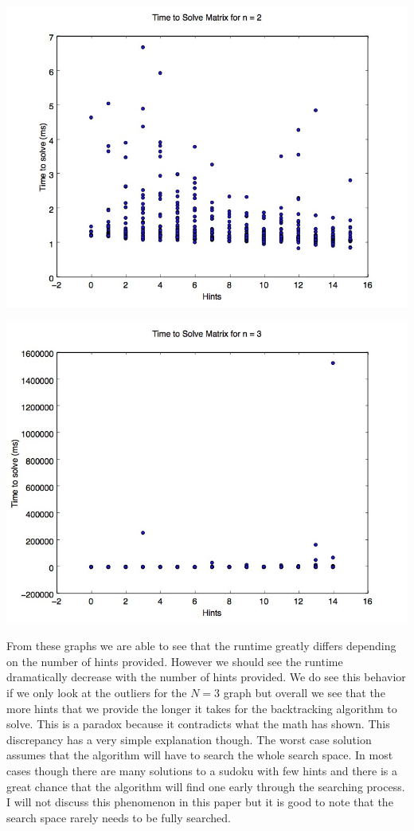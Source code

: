 \documentclass{sig-alternate}
\begin{document}
\includegraphics[width=\linewidth]{src/four.jpg}

\includegraphics[width=\linewidth]{src/nine.jpg}

From these graphs we are able to see that the runtime greatly differs depending on the number of hints provided. However we should see the runtime dramatically decrease with the number of hints provided. We do see this behavior if we only look at the outliers for the $N=3$ graph but overall we see that the more hints that we provide the longer it takes for the backtracking algorithm to solve. This is a paradox because it contradicts what the math has shown. This discrepancy has a very simple explanation though. The worst case solution assumes that the algorithm will have to search the whole search space. In most cases though there are many solutions to a sudoku with few hints and there is a great chance that the algorithm will find one early through the searching process. I will not discuss this phenomenon in this paper but it is good to note that the search space rarely needs to be fully searched. 
\end{document}
